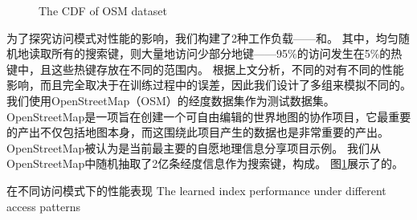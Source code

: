 
\begin{figure}[!htp]
  \centering
    {The CDF of OSM dataset}
  \label{fig:osm-cdf}
\end{figure}

为了探究访问模式对{\li}性能的影响，我们构建了2种工作负载{------}{\uniwl}和{\skewwl}。
其中，{\uniwl}均匀随机地读取所有的搜索键，{\skewwl}则大量地访问少部分地键{------}95\%的访问发生在5\%的热键中，且这些热键存放在不同的范围内。
根据上文分析，不同的{\skewacc}对{\rmi}有不同的性能影响，而且完全取决于{\model}在训练过程中的误差，因此我们设计了多组{\skewwl}来模拟不同的{\skewacc}。
我们使用OpenStreetMap\cite{osm}（OSM）的经度数据集作为测试数据集。
OpenStreetMap是一项旨在创建一个可自由编辑的世界地图的协作项目，它最重要的产出不仅包括地图本身，而这围绕此项目产生的数据也是非常重要的产出。
OpenStreetMap被认为是当前最主要的自愿地理信息分享项目示例。
我们从OpenStreetMap中随机抽取了2亿条经度信息作为搜索键，构成{\osm}。
图\ref{fig:osm-cdf}展示了{\osm}的{\cdf}。



\begin{table}[!hpb]
  \centering
  \bicaption[{\li}在不同访问模式下的性能表现]
    {{\li}在不同访问模式下的性能表现}
    {The learned index performance under different access patterns}
  \label{tab:pattern}
  \begin{tabular}{@{}llr@{}} \toprule
  \end{tabular}
\end{table}

